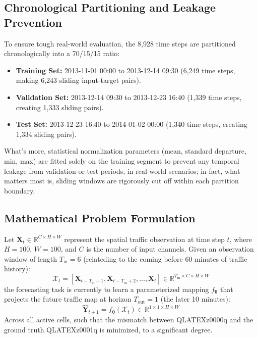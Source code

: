 \documentclass[conference]{IEEEtran}
\begin{document}
\subsection{Chronological Partitioning and Leakage Prevention}
To ensure tough real-world evaluation, the 8,928 time steps are partitioned chronologically into a 70/15/15 ratio:
\begin{itemize}
    \item \textbf{Training Set:} 2013-11-01 00:00 to 2013-12-14 09:30 (6,249 time steps, making 6,243 sliding input-target pairs).
    \item \textbf{Validation Set:} 2013-12-14 09:30 to 2013-12-23 16:40 (1,339 time steps, creating 1,333 sliding pairs).
    \item \textbf{Test Set:} 2013-12-23 16:40 to 2014-01-02 00:00 (1,340 time steps, creating 1,334 sliding pairs).
\end{itemize}
What's more, statistical normalization parameters (mean, standard departure, min, max) are fitted solely on the training segment to prevent any temporal leakage from validation or test periods, in real-world scenarios; in fact, what matters most is, sliding windows are rigorously cut off within each partition boundary.

\subsection{Mathematical Problem Formulation}
Let $\mathbf{X}_t \in \mathbb{R}^{C \times H \times W}$ represent the spatial traffic observation at time step $t$, where $H = 100$, $W = 100$, and $C$ is the number of input channels. Given an observation window of length $T_{\text{in}} = 6$ (relateding to the coming before 60 minutes of traffic history):
\begin{equation}
    \boldsymbol{\mathcal{X}}_t = \left[ \mathbf{X}_{t-T_{\text{in}}+1}, \mathbf{X}_{t-T_{\text{in}}+2}, \dots, \mathbf{X}_t \right] \in \mathbb{R}^{T_{\text{in}} \times C \times H \times W}
\end{equation}
the forecasting task is currently to learn a parameterized mapping $f_{\boldsymbol{\theta}}$ that projects the future traffic map at horizon $T_{\text{out}} = 1$ (the later 10 minutes):
\begin{equation}
    \hat{\mathbf{Y}}_{t+1} = f_{\boldsymbol{\theta}}(\boldsymbol{\mathcal{X}}_t) \in \mathbb{R}^{1 \times 1 \times H \times W}
\end{equation}
Across all active cells, such that the mismatch between QLATEXz0000q and the ground truth QLATEXz0001q is minimized, to a significant degree.
\end{document}
